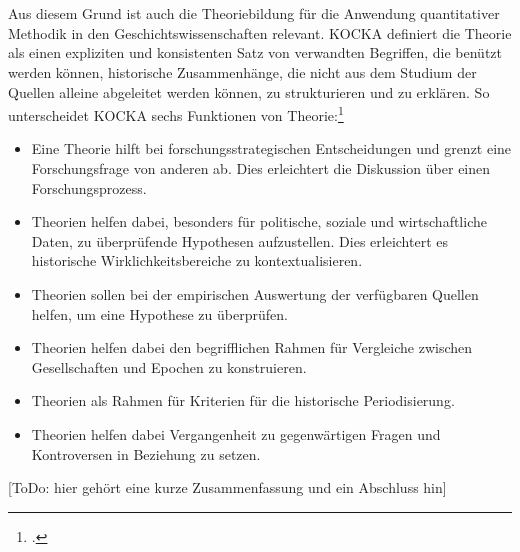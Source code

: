 \documentclass[12pt,a4paper]{article}
\begin{document}
\\
\\
Aus diesem Grund ist auch die Theoriebildung für die Anwendung quantitativer Methodik in den Geschichtswissenschaften relevant. KOCKA definiert die Theorie als einen expliziten und konsistenten Satz von verwandten Begriffen, die benützt werden können, historische Zusammenhänge, die nicht aus dem Studium der Quellen alleine abgeleitet werden können, zu strukturieren und zu erklären. So unterscheidet KOCKA  sechs Funktionen von Theorie:\footcite[Vgl.][S.10-14]{schroder1988historische}  
\begin{itemize}
\item Eine Theorie hilft bei forschungsstrategischen Entscheidungen und grenzt eine Forschungsfrage von anderen ab. Dies erleichtert die Diskussion über einen Forschungsprozess.
\item Theorien helfen dabei, besonders für politische, soziale und wirtschaftliche Daten, zu überprüfende Hypothesen aufzustellen. Dies erleichtert es historische Wirklichkeitsbereiche zu kontextualisieren.
\item Theorien sollen bei der empirischen Auswertung der verfügbaren Quellen helfen, um eine Hypothese zu überprüfen.
\item Theorien helfen dabei den begrifflichen Rahmen für Vergleiche zwischen Gesellschaften und Epochen zu konstruieren.
\item Theorien als Rahmen für  Kriterien für die historische Periodisierung.
\item  Theorien helfen dabei Vergangenheit zu gegenwärtigen Fragen und Kontroversen in Beziehung zu setzen. 
\end{itemize}
[ToDo: hier gehört eine kurze Zusammenfassung und ein Abschluss hin]



\newpage
\end{document}
